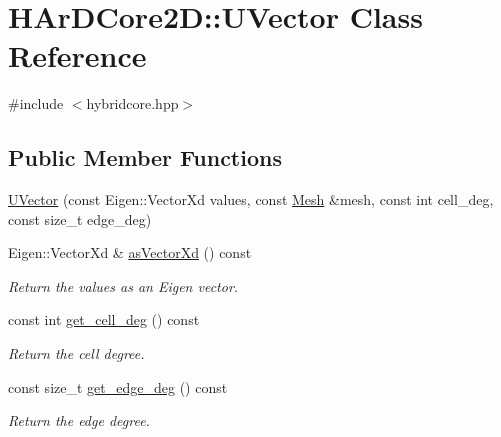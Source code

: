 \hypertarget{classHArDCore2D_1_1UVector}{}\section{H\+Ar\+D\+Core2D\+:\+:U\+Vector Class Reference}
\label{classHArDCore2D_1_1UVector}


{\ttfamily \#include $<$hybridcore.\+hpp$>$}

\subsection*{Public Member Functions}
\begin{DoxyCompactItemize}
\item 
\hyperlink{classHArDCore2D_1_1UVector_ac4eb49bfec491212a818bd6f6ef48e8d}{U\+Vector} (const Eigen\+::\+Vector\+Xd values, const \hyperlink{classHArDCore2D_1_1Mesh}{Mesh} \&mesh, const int cell\+\_\+deg, const size\+\_\+t edge\+\_\+deg)
\item 
\mbox{\label{classHArDCore2D_1_1UVector_a38b36a187519471f6cbe4719f14c5bd1}} 
Eigen\+::\+Vector\+Xd \& \hyperlink{classHArDCore2D_1_1UVector_a38b36a187519471f6cbe4719f14c5bd1}{as\+Vector\+Xd} () const
\begin{DoxyCompactList}\small\item\em Return the values as an Eigen vector. \end{DoxyCompactList}\item 
\mbox{\label{classHArDCore2D_1_1UVector_a57600052c8a5e1cf831982cc432376cb}} 
const int \hyperlink{classHArDCore2D_1_1UVector_a57600052c8a5e1cf831982cc432376cb}{get\+\_\+cell\+\_\+deg} () const
\begin{DoxyCompactList}\small\item\em Return the cell degree. \end{DoxyCompactList}\item 
\mbox{\label{classHArDCore2D_1_1UVector_a277b6f37671f574cf5b6726146513967}} 
const size\+\_\+t \hyperlink{classHArDCore2D_1_1UVector_a277b6f37671f574cf5b6726146513967}{get\+\_\+edge\+\_\+deg} () const
\begin{DoxyCompactList}\small\item\em Return the edge degree. \end{DoxyCompactList}\item 

\end{DoxyCompactItemize}

